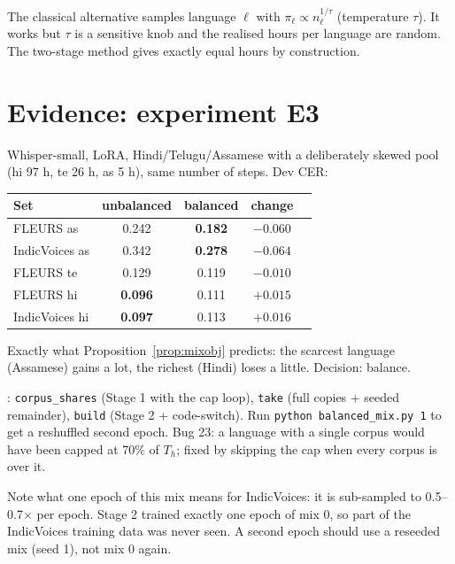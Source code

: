 \begin{intuition}
The classical alternative samples language $\ell$ with $\pi_\ell\propto n_\ell^{1/\tau}$ (temperature $\tau$). It works but $\tau$
is a sensitive knob and the realised hours per language are random. The two-stage method gives exactly equal hours by construction.
\end{intuition}

\section{Evidence: experiment E3}

Whisper-small, LoRA, Hindi/Telugu/Assamese with a deliberately skewed pool (hi 97 h, te 26 h, as 5 h), same number of steps. Dev CER:

\begin{center}
\begin{tabular}{lcccc}
\toprule
Set & unbalanced & balanced & change\\
\midrule
FLEURS as & 0.242 & \textbf{0.182} & $-0.060$\\
IndicVoices as & 0.342 & \textbf{0.278} & $-0.064$\\
FLEURS te & 0.129 & 0.119 & $-0.010$\\
FLEURS hi & \textbf{0.096} & 0.111 & $+0.015$\\
IndicVoices hi & \textbf{0.097} & 0.113 & $+0.016$\\
\bottomrule
\end{tabular}
\end{center}

Exactly what Proposition~\ref{prop:mixobj} predicts: the scarcest language (Assamese) gains a lot, the richest (Hindi) loses a
little. Decision: balance.

\begin{incode}
: \texttt{corpus\_shares} (Stage 1 with the cap loop), \texttt{take} (full copies + seeded remainder),
\texttt{build} (Stage 2 + code-switch). Run \texttt{python balanced\_mix.py 1} to get a reshuffled second epoch. Bug 23: a language
with a single corpus would have been capped at 70\% of $T_h$; fixed by skipping the cap when every corpus is over it.
\end{incode}

\begin{vivatip}
Note what one epoch of this mix means for IndicVoices: it is sub-sampled to 0.5--0.7$\times$ per epoch. Stage 2 trained exactly one
epoch of mix 0, so part of the IndicVoices training data was never seen. A second epoch should use a reseeded mix (seed 1), not
mix 0 again.
\end{vivatip}
